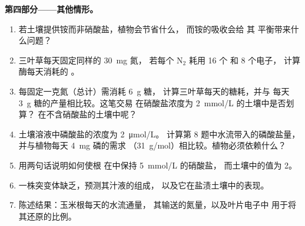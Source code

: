 \begin{problem}
\medskip
\noindent\textbf{第四部分——其他情形。}
\begin{enumerate}[resume]
  \item 若土壤提供铵而非硝酸盐，植物会节省什么，
        而铵的吸收会给
        其  平衡带来什么问题？
  \item 三叶草每天固定同样的 \qty{30}{mg} 氮，
        若每个 $\mathrm{N_2}$ 耗用 \qty{16}{} 个  和 \qty{8}{} 个电子，
        计算酶每天消耗的 。
  \item 每固定一克氮（总计）需消耗 \qty{6}{g} 糖，
        计算三叶草每天的糖耗，并与
        每天 \qty{3}{g} 糖的产量相比较。这笔交易
        在硝酸盐浓度为 \qty{2}{mmol/L} 的土壤中是否划算？
        在不含硝酸盐的土壤中呢？
  \item 土壤溶液中磷酸盐的浓度为 \qty{2}{\micro mol/L}。
        计算第 8 题中水流带入的磷酸盐量，
        并与植物每天 \qty{4}{mg} 磷的需求
        （\qty{31}{g/mol}）相比较。植物必须依赖什么？
  \item 用两句话说明如何使根
        在中保持 \qty{5}{mmol/L} 的硝酸盐，
        而土壤中的值为 \qty{2}{}。
  \item 一株突变体缺乏，预测其汁液的组成，
        以及它在盐渍土壤中的表现。
  \item 陈述结果：玉米根每天的水流通量，
        其输送的氮量，以及叶片电子中
        用于将其还原的比例。
\end{enumerate}
\end{problem}
